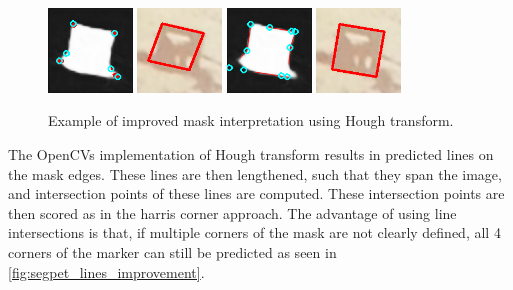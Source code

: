 \documentclass[10pt]{book}
\newcommand{\figureref}[1]{\autoref{#1}}
\begin{document}
\begin{figure}
  \centering
     {\includegraphics[width=0.2\textwidth]{image/segpet_mask_2_pred_corners}}
     {\includegraphics[width=0.2\textwidth]{image/segpet_mask_2_pred_rect}}
     {\includegraphics[width=0.2\textwidth]{image/segpet_mask_2_pred_intersects}}
     {\includegraphics[width=0.2\textwidth]{image/segpet_mask_2_lines_pred_rect}}
  \caption{Example of improved mask interpretation using Hough transform.}
  \label{fig:segpet_lines_improvement}
\end{figure}

The \acp{OpenCV} implementation of Hough transform results in predicted lines on the mask edges. These lines are then lengthened, such that they span the image, and intersection points of these lines are computed. These intersection points are then scored as in the harris corner approach. The advantage of using line intersections is that, if multiple corners of the mask are not clearly defined, all 4 corners of the marker can still be predicted as seen in \figureref{fig:segpet_lines_improvement}. %
\end{document}
